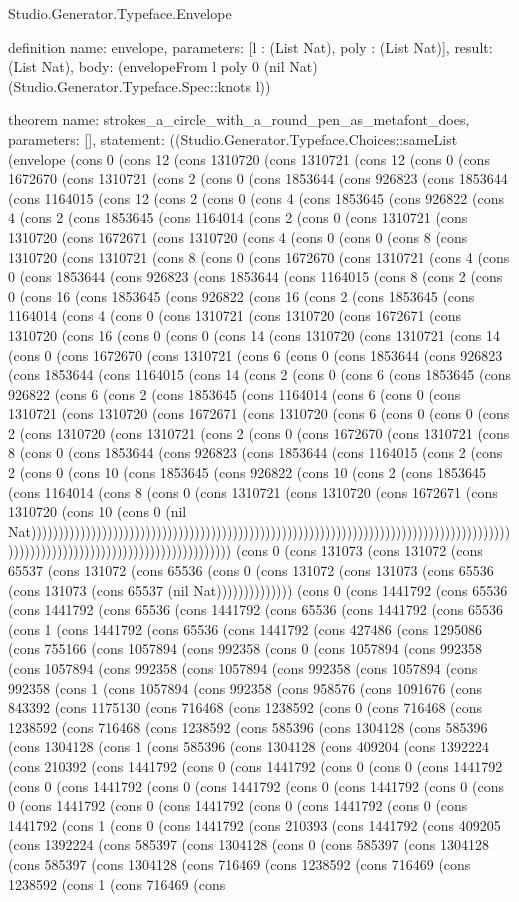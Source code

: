 \begin{lexlean}{Studio.Generator.Typeface.Envelope}
\begin{semanticmodule}
definition{
  name: envelope,
  parameters: [l : (List Nat), poly : (List Nat)],
  result: (List Nat),
  body: (envelopeFrom l poly 0 (nil Nat) (Studio.Generator.Typeface.Spec::knots l))
}

theorem{
  name: strokes_a_circle_with_a_round_pen_as_metafont_does,
  parameters: [],
  statement: ((Studio.Generator.Typeface.Choices::sameList (envelope (cons 0 (cons 12 (cons 1310720 (cons 1310721 (cons 12 (cons 0 (cons 1672670 (cons 1310721 (cons 2 (cons 0 (cons 1853644 (cons 926823 (cons 1853644 (cons 1164015 (cons 12 (cons 2 (cons 0 (cons 4 (cons 1853645 (cons 926822 (cons 4 (cons 2 (cons 1853645 (cons 1164014 (cons 2 (cons 0 (cons 1310721 (cons 1310720 (cons 1672671 (cons 1310720 (cons 4 (cons 0 (cons 0 (cons 8 (cons 1310720 (cons 1310721 (cons 8 (cons 0 (cons 1672670 (cons 1310721 (cons 4 (cons 0 (cons 1853644 (cons 926823 (cons 1853644 (cons 1164015 (cons 8 (cons 2 (cons 0 (cons 16 (cons 1853645 (cons 926822 (cons 16 (cons 2 (cons 1853645 (cons 1164014 (cons 4 (cons 0 (cons 1310721 (cons 1310720 (cons 1672671 (cons 1310720 (cons 16 (cons 0 (cons 0 (cons 14 (cons 1310720 (cons 1310721 (cons 14 (cons 0 (cons 1672670 (cons 1310721 (cons 6 (cons 0 (cons 1853644 (cons 926823 (cons 1853644 (cons 1164015 (cons 14 (cons 2 (cons 0 (cons 6 (cons 1853645 (cons 926822 (cons 6 (cons 2 (cons 1853645 (cons 1164014 (cons 6 (cons 0 (cons 1310721 (cons 1310720 (cons 1672671 (cons 1310720 (cons 6 (cons 0 (cons 0 (cons 2 (cons 1310720 (cons 1310721 (cons 2 (cons 0 (cons 1672670 (cons 1310721 (cons 8 (cons 0 (cons 1853644 (cons 926823 (cons 1853644 (cons 1164015 (cons 2 (cons 2 (cons 0 (cons 10 (cons 1853645 (cons 926822 (cons 10 (cons 2 (cons 1853645 (cons 1164014 (cons 8 (cons 0 (cons 1310721 (cons 1310720 (cons 1672671 (cons 1310720 (cons 10 (cons 0 (nil Nat))))))))))))))))))))))))))))))))))))))))))))))))))))))))))))))))))))))))))))))))))))))))))))))))))))))))))))))))))))))))))))))))) (cons 0 (cons 131073 (cons 131072 (cons 65537 (cons 131072 (cons 65536 (cons 0 (cons 131072 (cons 131073 (cons 65536 (cons 131073 (cons 65537 (nil Nat)))))))))))))) (cons 0 (cons 1441792 (cons 65536 (cons 1441792 (cons 65536 (cons 1441792 (cons 65536 (cons 1441792 (cons 65536 (cons 1 (cons 1441792 (cons 65536 (cons 1441792 (cons 427486 (cons 1295086 (cons 755166 (cons 1057894 (cons 992358 (cons 0 (cons 1057894 (cons 992358 (cons 1057894 (cons 992358 (cons 1057894 (cons 992358 (cons 1057894 (cons 992358 (cons 1 (cons 1057894 (cons 992358 (cons 958576 (cons 1091676 (cons 843392 (cons 1175130 (cons 716468 (cons 1238592 (cons 0 (cons 716468 (cons 1238592 (cons 716468 (cons 1238592 (cons 585396 (cons 1304128 (cons 585396 (cons 1304128 (cons 1 (cons 585396 (cons 1304128 (cons 409204 (cons 1392224 (cons 210392 (cons 1441792 (cons 0 (cons 1441792 (cons 0 (cons 0 (cons 1441792 (cons 0 (cons 1441792 (cons 0 (cons 1441792 (cons 0 (cons 1441792 (cons 0 (cons 0 (cons 1441792 (cons 0 (cons 1441792 (cons 0 (cons 1441792 (cons 0 (cons 1441792 (cons 1 (cons 0 (cons 1441792 (cons 210393 (cons 1441792 (cons 409205 (cons 1392224 (cons 585397 (cons 1304128 (cons 0 (cons 585397 (cons 1304128 (cons 585397 (cons 1304128 (cons 716469 (cons 1238592 (cons 716469 (cons 1238592 (cons 1 (cons 716469 (cons }
\end{semanticmodule}
\end{lexlean}
